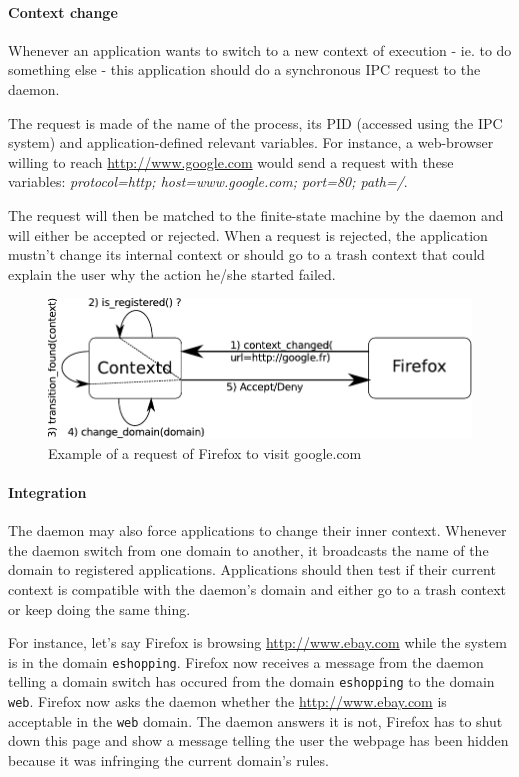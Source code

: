\documentclass[conference]{IEEEtran}
\begin{document}
			\paragraph{Context change} 
			Whenever an application wants to switch to a new context of execution - ie. to do something else - this application should do a synchronous IPC request to the daemon.

			The request is made of the name of the process, its PID (accessed using the IPC system) and application-defined relevant variables. 
			For instance, a web-browser willing to reach \url{http://www.google.com} would send a request with these variables:
			{\it protocol=http; host=www.google.com; port=80; path=/}.

			The request will then be matched to the finite-state machine by the daemon and will either be accepted or rejected. When a request is rejected,
			the application mustn't change its internal context or should go to a trash context that could explain the user why the action
			he/she started failed.

			\begin{figure}[h!]
				\centering
				\includegraphics[scale=0.6]{app_contextchanged.pdf}
				\caption{Example of a request of Firefox to visit google.com}
				\label{app_contextchanged}
			\end{figure}

			\paragraph{Integration} 
			The daemon may also force applications to change their inner context. Whenever the daemon switch from one domain to another, it broadcasts
			the name of the domain to registered applications. Applications should then test if their current context is compatible with the daemon's domain 
			and either go to a trash context or keep doing the same thing.

			For instance, let's say Firefox is browsing \url{http://www.ebay.com} while the system is in the domain \texttt{eshopping}. Firefox now receives a message from the daemon
			telling a domain switch has occured from the domain \texttt{eshopping} to the domain \texttt{web}. Firefox now asks the daemon whether 
			the \url{http://www.ebay.com} is acceptable in the \texttt{web} domain. The daemon answers it is not, Firefox has to shut down this page and show a message
			telling the user the webpage has been hidden because it was infringing the current domain's rules. 
\end{document}
